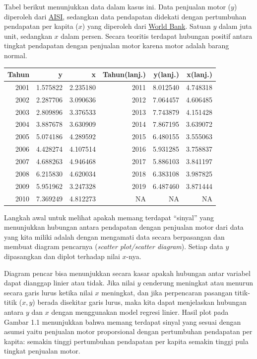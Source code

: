\documentclass[
]{book}
\begin{document}
Tabel berikut menunjukkan data dalam kasus ini. Data penjualan motor (\(y\))
diperoleh dari \href{https://www.aisi.or.id/}{AISI}, sedangkan data
pendapatan didekati dengan pertumbuhan pendapatan per kapita (\(x\)) yang
diperoleh dari \href{https://datacatalog.worldbank.org/home}{World Bank}.
Satuan \(y\) dalam juta unit, sedangkan \(x\) dalam persen. Secara teoritis
terdapat hubungan positif antara tingkat pendapatan dengan penjualan
motor karena motor adalah barang normal.

\begin{table}
\centering
\begin{tabular}[t]{r|r|r|r|r|r}
\hline
Tahun & y & x & Tahun(lanj.) & y(lanj.) & x(lanj.)\\
\hline
2001 & 1.575822 & 2.235180 & 2011 & 8.012540 & 4.748318\\
\hline
2002 & 2.287706 & 3.090636 & 2012 & 7.064457 & 4.606485\\
\hline
2003 & 2.809896 & 3.376533 & 2013 & 7.743879 & 4.151428\\
\hline
2004 & 3.887678 & 3.630909 & 2014 & 7.867195 & 3.639072\\
\hline
2005 & 5.074186 & 4.289592 & 2015 & 6.480155 & 3.555063\\
\hline
2006 & 4.428274 & 4.107514 & 2016 & 5.931285 & 3.758837\\
\hline
2007 & 4.688263 & 4.946468 & 2017 & 5.886103 & 3.841197\\
\hline
2008 & 6.215830 & 4.620034 & 2018 & 6.383108 & 3.987825\\
\hline
2009 & 5.951962 & 3.247328 & 2019 & 6.487460 & 3.871444\\
\hline
2010 & 7.369249 & 4.812273 & NA & NA & NA\\
\hline
\end{tabular}
\end{table}

Langkah awal untuk melihat apakah memang terdapat ``sinyal'' yang menunjukkan hubungan antara pendapatan dengan penjualan motor dari data yang kita miliki adalah dengan mengamati data secara berpasangan dan membuat diagram pencarnya (\emph{scatter plot/scatter diagram}). Setiap data \(y\) dipasangkan dan diplot terhadap nilai \(x\)-nya.

Diagram pencar bisa menunjukkan secara kasar apakah hubungan antar variabel dapat dianggap linier atau tidak. Jika nilai \(y\) cenderung meningkat atau menurun secara garis lurus ketika nilai \(x\) meningkat, dan jika perpencaran pasangan titik-titik (\(x,y\)) berada disekitar garis lurus, maka kita dapat menjelaskan hubungan antara \(y\) dan \(x\) dengan menggunakan model regresi linier. Hasil plot pada Gambar 1.1 menunjukkan bahwa memang terdapat sinyal yang sesuai dengan asumsi yaitu penjualan motor proporsional dengan pertumbuhan pendapatan per kapita: semakin tinggi pertumbuhan pendapatan per kapita semakin tinggi pula tingkat penjualan motor.
\end{document}
